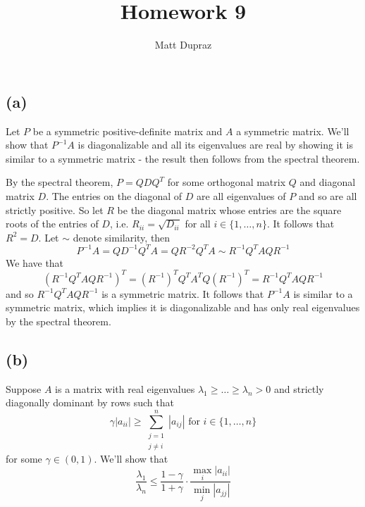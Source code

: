\documentclass{article}
\title{Homework 9}
\author{Matt Dupraz}
\begin{document}
\maketitle

\subsection*{(a)}

Let $P$ be a symmetric positive-definite matrix and
$A$ a symmetric matrix. We'll show that $P^{-1}A$ is
diagonalizable and all its eigenvalues are real by showing it
is similar to a symmetric matrix - the result then follows
from the spectral theorem.

By the spectral theorem, $P = QDQ^T$ for some orthogonal matrix
$Q$ and diagonal matrix $D$. The entries on the diagonal 
of $D$ are all eigenvalues of $P$ and so are all strictly positive.
So let $R$ be the diagonal matrix whose entries are the square roots
of the entries of $D$, i.e. $R_{ii} = \sqrt{D_{ii}}$ for all
$i \in \{1, \dots, n\}$. It follows that $R^2 = D$.
Let $\sim$ denote similarity, then
\begin{equation*}
	P^{-1}A = QD^{-1}Q^TA = QR^{-2}Q^TA \sim R^{-1}Q^TAQR^{-1}
\end{equation*}
We have that 
\begin{equation*}
(R^{-1}Q^TAQR^{-1})^T = (R^{-1})^TQ^TA^TQ(R^{-1})^T
= R^{-1}Q^TAQR^{-1}
\end{equation*}
and so $R^{-1}Q^TAQR^{-1}$ is a symmetric matrix. It follows
that $P^{-1}A$ is similar to a symmetric matrix, which implies
it is diagonalizable and has only real eigenvalues by the
spectral theorem.

\subsection*{(b)}

Suppose $A$ is a matrix with real eigenvalues
$\lambda_1 \geq \dots \geq \lambda_n > 0$ and strictly diagonally
dominant by rows such that 
\begin{equation}
	\label{dominance}
	\gamma|a_{ii}| \geq \sum_{\substack{j = 1 \\ j \neq i}}^n
	|a_{ij}|\text{ for } i \in \{1, \dots, n\}
\end{equation}
for some $\gamma \in (0, 1)$.
We'll show that 
\begin{equation*}
	\frac{\lambda_1}{\lambda_n} \leq \frac{1 - \gamma}{1 + \gamma}
	\cdot \frac{\max_i|a_{ii}|}{\min_j|a_{jj}|}
\end{equation*}
\end{document}
